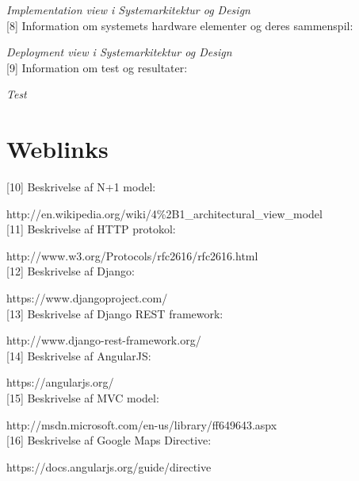 \qquad \textit{ Implementation view i Systemarkitektur og Design} \\


[8] Information om systemets hardware elementer og deres sammenspil:
\vspace{-0.3cm}

\qquad \textit{Deployment view i Systemarkitektur og Design} \\


[9] Information om test og resultater:
\vspace{-0.3cm}

\qquad \textit{Test} \\


\newpage

\section*{Weblinks}
 
[10] Beskrivelse af N+1 model:
\vspace{-0.3cm}

\qquad http://en.wikipedia.org/wiki/4\%2B1\_architectural\_view\_model \\ 


[11] Beskrivelse af HTTP protokol:
\vspace{-0.3cm}

\qquad  http://www.w3.org/Protocols/rfc2616/rfc2616.html\\


[12] Beskrivelse af Django:
\vspace{-0.3cm}

\qquad https://www.djangoproject.com/ \\ 


[13] Beskrivelse af Django REST framework:
\vspace{-0.3cm}

\qquad http://www.django-rest-framework.org/ \\ 


[14] Beskrivelse af AngularJS:
\vspace{-0.3cm}

\qquad https://angularjs.org/ \\ 


[15] Beskrivelse af MVC model:
\vspace{-0.3cm}

\qquad http://msdn.microsoft.com/en-us/library/ff649643.aspx \\ 


[16] Beskrivelse af Google Maps Directive:
\vspace{-0.3cm}

\qquad https://docs.angularjs.org/guide/directive  
